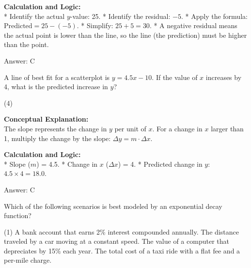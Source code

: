 \documentclass[11pt,paper=a4,answers]{exam}
\begin{document}
\begin{questions}
\begin{solution}
\textbf{Calculation and Logic:} \\
* Identify the actual $y$-value: 25.
* Identify the residual: $-5$.
* Apply the formula: $\text{Predicted} = 25 - (-5)$.
* Simplify: $25 + 5 = 30$.
* A negative residual means the actual point is lower than the line, so the line (the prediction) must be higher than the point.

\vspace{30pt}

Answer: \colorbox{yellow!100}{C}
\end{solution}

\vspace{60pt}

\question
A line of best fit for a scatterplot is $y = 4.5x - 10$. If the value of $x$ increases by 4, what is the predicted increase in $y$?
\begin{tasks}(4)
\end{tasks}

\begin{solution}
\textbf{Conceptual Explanation:} \\
The slope represents the change in $y$ per unit of $x$. For a change in $x$ larger than 1, multiply the change by the slope: $\Delta y = m \cdot \Delta x$.

\vspace{30pt}

\textbf{Calculation and Logic:} \\
* Slope ($m$) = 4.5.
* Change in $x$ ($\Delta x$) = 4.
* Predicted change in $y$: $4.5 \times 4 = 18.0$.

\vspace{30pt}

Answer: \colorbox{yellow!100}{C}
\end{solution}

\vspace{60pt}

\question
Which of the following scenarios is best modeled by an exponential decay function?
\begin{tasks}(1)
    \task A bank account that earns 2\% interest compounded annually.
    \task The distance traveled by a car moving at a constant speed.
    \task The value of a computer that depreciates by 15\% each year.
    \task The total cost of a taxi ride with a flat fee and a per-mile charge.
\end{tasks}


\end{questions}
\end{document}
